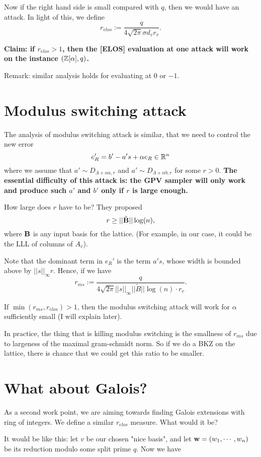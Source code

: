 \documentclass{amsart}
\begin{document}
Now if the right hand side is small compared with $q$, then we would have an attack. In light of this, we define
\[
    r_{elos} := \frac{q}{4\sqrt{2\pi} \sigma d_v r_v}.
\]

{\bf Claim: if $r_{elos} > 1$, then the [ELOS] evaluation at one attack will work on the instance $(\mathbb{Z}[\alpha], q)$. }


Remark: similar analysis holds for evaluating at 0 or $-1$.


\section{Modulus switching attack}

The analysis of modulus switching attack is similar, that we need to control the new error
\[
    e_R' = b' - a's + \alpha e_R \in \mathbb{R}^n
\]
where we assume that $a' \sim D_{\Lambda + \alpha a, r}$ and $a' \sim D_{\Lambda + \alpha b, r}$ for some $r > 0$.
{\bf The essential difficulty of this attack is: the GPV sampler will only work and produce such $a'$ and $b'$ only
if $r$ is large enough. }

How large does $r$ have to be? They proposed
$$r \geq ||\tilde{\bf B}|| \log(n),$$
where ${\bf B}$ is any input basis for the lattice. (For example, in our case, it could be the LLL of columns of $A_v$).

Note that the dominant term in $e_R'$ is the term $a's$, whose width is bounded above by $||s||_\infty r$. Hence,
if we have
\[
    r_{ms} := \frac{q}{4 \sqrt{2 \pi}||s||_\infty ||\tilde{B}|| \log(n) \cdot r_v}.
\]

If $\min(r_{ms},r_{elos}) > 1$, then the modulus switching attack will work for $\alpha$ sufficiently small (I will explain later).

In practice, the thing that is killing modulus switching is the smallness of $r_{ms}$ due to largeness of the maximal gram-schmidt norm. So if we do a BKZ on the lattice, there is chance that we could get this ratio to
be smaller.

\section{What about Galois?}

As a second work point, we are aiming towards finding Galois extensions with ring of integers. We define a similar $r_{elos}$ measure. What would it be?

It would be like this: let $v$ be our chosen "nice basis", and let ${\bf w} = (w_1, \cdots, w_n)$ be its reduction modulo some split prime $q$. Now we have
\end{document}
